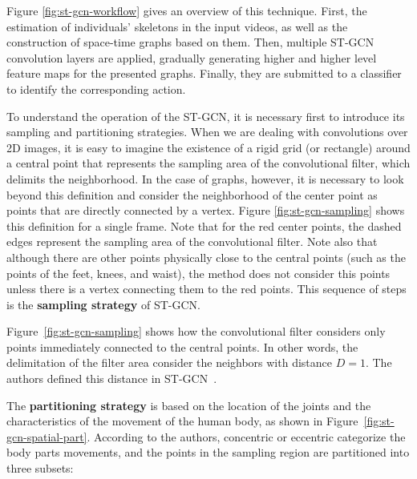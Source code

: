 Figure \ref{fig:st-gcn-workflow} gives an overview of this technique. First, the estimation of individuals' skeletons in the input videos, as well as the construction of space-time graphs based on them. Then, multiple ST-GCN convolution layers are applied, gradually generating higher and higher level feature maps for the presented graphs. Finally, they are submitted to a classifier to identify the corresponding action.


To understand the operation of the ST-GCN, it is necessary first to introduce its sampling and partitioning strategies. When we are dealing with convolutions over 2D images, it is easy to imagine the existence of a rigid grid (or rectangle) around a central point that represents the sampling area of the convolutional filter, which delimits the neighborhood. In the case of graphs, however, it is necessary to look beyond this definition and consider the neighborhood of the center point as points that are directly connected by a vertex. Figure \ref{fig:st-gcn-sampling} shows this definition for a single frame. Note that for the red center points, the dashed edges represent the sampling area of the convolutional filter. Note also that although there are other points physically close to the central points (such as the points of the feet, knees, and waist), the method does not consider this points unless there is a vertex connecting them to the red points. This sequence of steps is the \textbf{sampling strategy} of ST-GCN.


Figure~\ref{fig:st-gcn-sampling} shows how the convolutional filter considers only points immediately connected to the central points. In other words, the delimitation of the filter area consider the neighbors with distance $D = 1$. The authors defined this distance in ST-GCN~\cite{st-gcn-2018}.

The \textbf{partitioning strategy} is based on the location of the joints and the characteristics of the movement of the human body, as shown in Figure~\ref{fig:st-gcn-spatial-part}. According to the authors, concentric or eccentric categorize the body parts movements, and the points in the sampling region are partitioned into three subsets:
    
